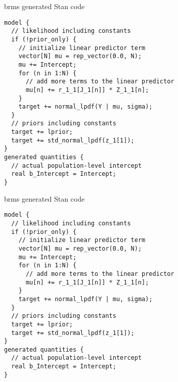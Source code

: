 \documentclass[finnish,english,t]{beamer}
\begin{document}
\begin{frame}[fragile]{brms generated Stan code}

  \vspace{-\baselineskip}
\begin{verbatim}
model {
  // likelihood including constants
  if (!prior_only) {
    // initialize linear predictor term
    vector[N] mu = rep_vector(0.0, N);
    mu += Intercept;
    for (n in 1:N) {
      // add more terms to the linear predictor
      mu[n] += r_1_1[J_1[n]] * Z_1_1[n];
    }
    target += normal_lpdf(Y | mu, sigma);
  }
  // priors including constants
  target += lprior;
  target += std_normal_lpdf(z_1[1]);
}
generated quantities {
  // actual population-level intercept
  real b_Intercept = Intercept;
}
\end{verbatim}

\end{frame}

\begin{frame}[fragile]{brms generated Stan code}

  \vspace{-\baselineskip}
\begin{verbatim}
model {
  // likelihood including constants
  if (!prior_only) {
    // initialize linear predictor term
    vector[N] mu = rep_vector(0.0, N);
    mu += Intercept;
    for (n in 1:N) {
      // add more terms to the linear predictor
      mu[n] += r_1_1[J_1[n]] * Z_1_1[n];
    }
    target += normal_lpdf(Y | mu, sigma);
  }
  // priors including constants
  target += lprior;
  target += std_normal_lpdf(z_1[1]);
}
generated quantities {
  // actual population-level intercept
  real b_Intercept = Intercept;
}
\end{verbatim}

\end{frame}

\end{document}
